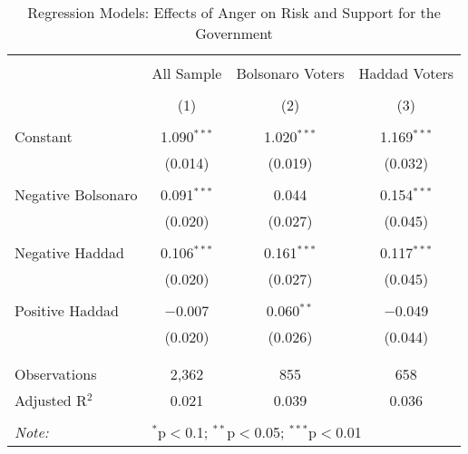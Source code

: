 
\begin{table}[!htbp] \centering 
  \caption{Regression Models: Effects of Anger on Risk and Support for the Government} 
  \label{autopsy} 
\begin{tabular}{@{\extracolsep{5pt}}lccc} 
\\[-1.8ex]\hline 
\hline \\[-1.8ex] 
 & All Sample & Bolsonaro Voters & Haddad Voters \\ 
\\[-1.8ex] & (1) & (2) & (3)\\ 
\hline \\[-1.8ex] 
 Constant & 1.090$^{***}$ & 1.020$^{***}$ & 1.169$^{***}$ \\ 
  & (0.014) & (0.019) & (0.032) \\ 
  & & & \\ 
 Negative Bolsonaro & 0.091$^{***}$ & 0.044 & 0.154$^{***}$ \\ 
  & (0.020) & (0.027) & (0.045) \\ 
  & & & \\ 
 Negative Haddad & 0.106$^{***}$ & 0.161$^{***}$ & 0.117$^{***}$ \\ 
  & (0.020) & (0.027) & (0.045) \\ 
  & & & \\ 
 Positive Haddad & $-$0.007 & 0.060$^{**}$ & $-$0.049 \\ 
  & (0.020) & (0.026) & (0.044) \\ 
  & & & \\ 
\hline \\[-1.8ex] 
Observations & 2,362 & 855 & 658 \\ 
Adjusted R$^{2}$ & 0.021 & 0.039 & 0.036 \\ 
\hline 
\hline \\[-1.8ex] 
\textit{Note:}  & \multicolumn{3}{l}{$^{*}$p$<$0.1; $^{**}$p$<$0.05; $^{***}$p$<$0.01} \\ 
\end{tabular} 
\end{table} 

